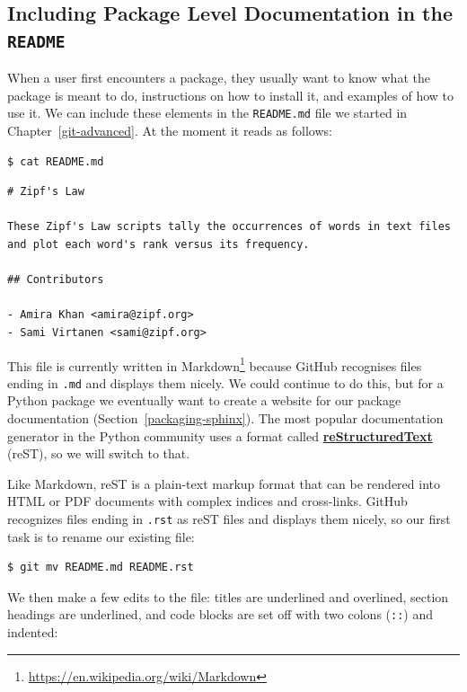 \documentclass[
]{krantz}
\renewcommand{\href}[2]{#2\footnote{\url{#1}}}
\newcommand{\gref}[2]{\hyperlink{#2}{\textbf{#1}}}
\begin{document}
\hypertarget{packaging-readme}{%
\subsection{\texorpdfstring{Including Package Level Documentation in the \texttt{README}}{Including Package Level Documentation in the README}}\label{packaging-readme}}

When a user first encounters a package,
they usually want to know what the package is meant to do,
instructions on how to install it,
and examples of how to use it.
We can include these elements in the \texttt{README.md} file we started in Chapter~\ref{git-advanced}.
At the moment it reads as follows:

\begin{verbatim}
$ cat README.md
\end{verbatim}

\begin{verbatim}
# Zipf's Law

These Zipf's Law scripts tally the occurrences of words in text files
and plot each word's rank versus its frequency.

## Contributors

- Amira Khan <amira@zipf.org>
- Sami Virtanen <sami@zipf.org>
\end{verbatim}

This file is currently written in \href{https://en.wikipedia.org/wiki/Markdown}{Markdown}
because GitHub recognises files ending in \texttt{.md} and displays them nicely.
We could continue to do this,
but for a Python package we eventually want
to create a website for our package documentation (Section~\ref{packaging-sphinx}).
The most popular documentation generator in the Python community
uses a format called \gref{reStructuredText}{restructured\_text} (reST),
so we will switch to that.

Like Markdown,
reST is a plain-text markup format
that can be rendered into HTML or PDF documents
with complex indices and cross-links.
GitHub recognizes files ending in \texttt{.rst} as reST files and displays them nicely,
so our first task is to rename our existing file:

\begin{verbatim}
$ git mv README.md README.rst
\end{verbatim}

We then make a few edits to the file:
titles are underlined and overlined,
section headings are underlined,
and code blocks are set off with two colons (\texttt{::}) and indented:
\end{document}
